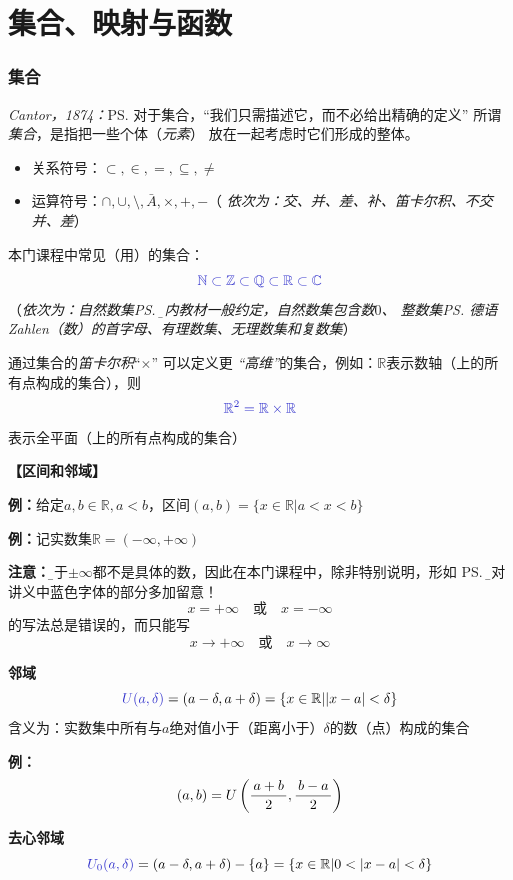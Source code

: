 
\section{集合、映射与函数}

\subsubsection{集合}

{\it Cantor，1874：}\ps{对于集合，“我们只需描述它，而不必给出精确的定义”}
所谓{\it 集合}，是指把一些个体（{\it 元素}） 放在一起考虑时它们形成的整体。
\begin{itemize}
  \setlength{\itemindent}{1cm}
  \item 关系符号：$\subset, \in, =, \subseteq, \neq$
  \item 运算符号：$\cap,\cup, \setminus, \bar{A}, \times, +, - $\quad （{\it
  依次为：交、并、差、补、笛卡尔积、不交并、差}）
\end{itemize}
	
本门课程中常见（用）的集合：
$$\b\mathbb{N}\subset\mathbb{Z}\subset\mathbb{Q}
\subset\mathbb{R}\subset\mathbb{C}$$
\quad（{\it 依次为：自然数集\ps{\b 国内教材一般约定，自然数集包含数$0$}、
整数集\ps{德语Zahlen（数）的首字母}、有理数集、无理数集和复数集}）


通过集合的{\it 笛卡尔积}“$\times$” 可以定义更{\it
“高维”}的集合，例如：$\mathbb{R}$表示数轴（上的所有点构成的集合），则
$${\b \mathbb{R}^2=\mathbb{R}\times\mathbb{R}}$$
表示全平面（上的所有点构成的集合）

{\bf 【区间和邻域】}

{\bf 例：}给定$a,b\in\mathbb{R},a<b$，区间$(a,b)=\{x\in\mathbb{R}|a<x<b\}$

{\bf 例：}记实数集$\mathbb{R}=(-\infty,+\infty)$

{\bf 注意：}{\b 由于$\pm\infty$都不是具体的数，因此在本门课程中，除非特别说明，形如
\ps{\b 请对讲义中蓝色字体的部分多加留意！}
$$x=+\infty\quad\mbox{或}\quad x=-\infty$$
的写法总是错误的，而只能写
$$x\to+\infty\quad\mbox{或}\quad x\to\infty$$
}

{\bf 邻域}
$${\b U(a,\delta)}=(a-\delta,a+\delta)=\{x\in\mathbb{R}||x-a|<\delta\}$$
含义为：实数集中所有与$a$绝对值小于（距离小于）$\delta$的数（点）构成的集合

{\bf 例：}
$$(a,b)=U\left(\displaystyle\frac{\,{a+b}\,}{\,{2}\,},\displaystyle\frac{\,{b-a}\,}{\,{2}\,}\right)$$

{\bf 去心邻域}
$${\b
U_0(a,\delta)}=(a-\delta,a+\delta)-\{a\}=\{x\in\mathbb{R}|0<|x-a|<\delta\}$$


